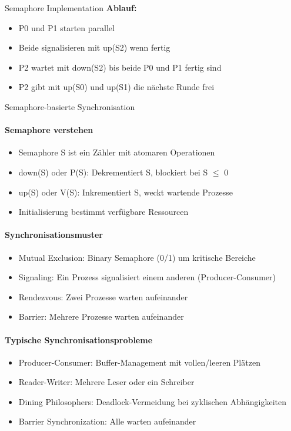 \begin{example2}{Semaphore Implementation}
    \textbf{Ablauf:}
    \begin{itemize}
        \item P0 und P1 starten parallel
        \item Beide signalisieren mit up(S2) wenn fertig
        \item P2 wartet mit down(S2) bis beide P0 und P1 fertig sind
        \item P2 gibt mit up(S0) und up(S1) die nächste Runde frei
    \end{itemize}
\end{example2}

\begin{KR}{Semaphore-basierte Synchronisation}
    \paragraph{Semaphore verstehen}
    \begin{itemize}
        \item Semaphore S ist ein Zähler mit atomaren Operationen
        \item down(S) oder P(S): Dekrementiert S, blockiert bei S $\leq$  0
        \item up(S) oder V(S): Inkrementiert S, weckt wartende Prozesse
        \item Initialisierung bestimmt verfügbare Ressourcen
    \end{itemize}
    
    \paragraph{Synchronisationsmuster}
    \begin{itemize}
        \item Mutual Exclusion: Binary Semaphore (0/1) um kritische Bereiche
        \item Signaling: Ein Prozess signalisiert einem anderen (Producer-Consumer)
        \item Rendezvous: Zwei Prozesse warten aufeinander
        \item Barrier: Mehrere Prozesse warten aufeinander
    \end{itemize}
    
    \paragraph{Typische Synchronisationsprobleme}
    \begin{itemize}
        \item Producer-Consumer: Buffer-Management mit vollen/leeren Plätzen
        \item Reader-Writer: Mehrere Leser oder ein Schreiber
        \item Dining Philosophers: Deadlock-Vermeidung bei zyklischen Abhängigkeiten
        \item Barrier Synchronization: Alle warten aufeinander
    \end{itemize}
    

\end{KR}
